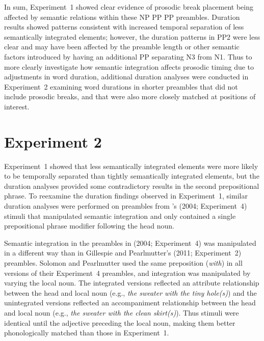 \documentclass[12pt,titlepage]{article}
\begin{document}
In sum, Experiment~1 showed clear evidence of prosodic break placement being affected by semantic relations within these NP PP PP preambles. Duration results showed patterns consistent with increased temporal separation of less semantically integrated elements; however, the duration patterns in PP2 were less clear and may have been affected by the preamble length or other semantic factors introduced by having an additional PP separating N3 from N1.  Thus to more clearly investigate how semantic integration affects prosodic timing due to adjustments in word duration, additional duration analyses were conducted in Experiment~2 examining word durations in shorter preambles that did not include prosodic breaks, and that were also more closely matched at positions of interest.

\section{Experiment 2}

Experiment~1 showed that less semantically integrated elements were more likely to be temporally separated than tightly semantically integrated elements, but the duration analyses provided some contradictory results in the second prepositional phrase. To reexamine the duration findings observed in Experiment~1, similar duration analyses were performed on preambles from \citeauthor{SolomonPearlmutter04}'s (2004; Experiment~4) stimuli that manipulated semantic integration and only contained a single prepositional phrase modifier following the head noun. 

Semantic integration in the preambles in \citeauthor{SolomonPearlmutter04} (2004; Experiment~4) was manipulated in a different way than in Gillespie and Pearlmutter's (2011; Experiment~2) preambles. Solomon and Pearlmutter used the same preposition (\textit{with}) in all versions of their Experiment~4 preambles, and integration was manipulated by varying the local noun. The integrated versions reflected an attribute relationship between the head and local noun (e.g., \textit{the sweater with the tiny hole(s)}) and the unintegrated versions reflected an accompaniment relationship between the head and local noun (e.g., \textit{the sweater with the clean skirt(s)}). Thus stimuli were identical until the adjective preceding the local noun, making them better phonologically matched than those in Experiment~1.

 
\end{document}
